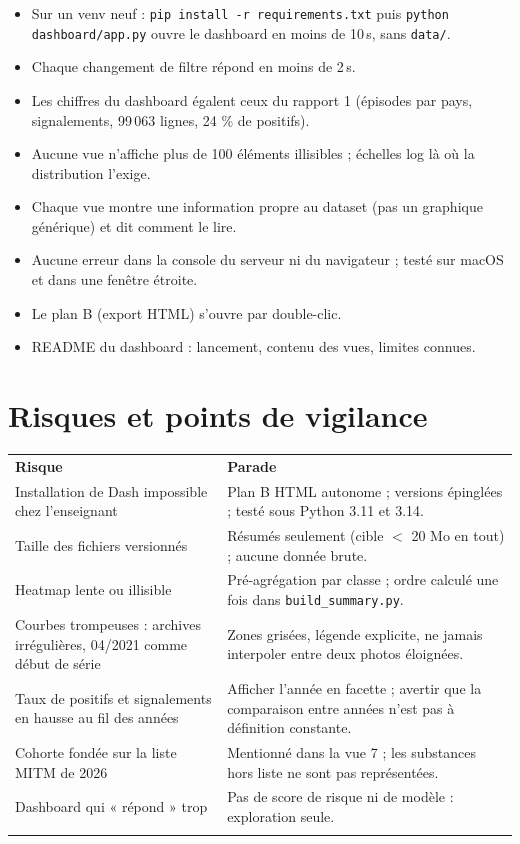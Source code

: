 \documentclass[10.5pt, a4paper]{article}
\newcommand{\entete}[1]{\textbf{\color{gris!20!black}#1}}
\newcommand{\filet}{\arrayrulecolor{gris!40}\hline}
\begin{document}
\begin{itemize}
\item[$\square$] Sur un venv neuf : \texttt{pip install -r requirements.txt} puis \texttt{python dashboard/app.py} ouvre le dashboard en moins de 10\,s, sans \texttt{data/}.
\item[$\square$] Chaque changement de filtre répond en moins de 2\,s.
\item[$\square$] Les chiffres du dashboard égalent ceux du rapport 1 (épisodes par pays, signalements, 99\,063 lignes, 24 \% de positifs).
\item[$\square$] Aucune vue n'affiche plus de 100 éléments illisibles ; échelles log là où la distribution l'exige.
\item[$\square$] Chaque vue montre une information propre au dataset (pas un graphique générique) et dit comment le lire.
\item[$\square$] Aucune erreur dans la console du serveur ni du navigateur ; testé sur macOS et dans une fenêtre étroite.
\item[$\square$] Le plan B (export HTML) s'ouvre par double-clic.
\item[$\square$] README du dashboard : lancement, contenu des vues, limites connues.
\end{itemize}

\section{Risques et points de vigilance}

\begin{tabularx}{\linewidth}{>{\raggedright\arraybackslash}p{5.0cm} >{\raggedright\arraybackslash}X}
\rowcolor{gris!14}\entete{Risque} & \entete{Parade}\\
Installation de Dash impossible chez l'enseignant & Plan B HTML autonome ; versions épinglées ; testé sous Python 3.11 et 3.14. \\
Taille des fichiers versionnés & Résumés seulement (cible $<$ 20 Mo en tout) ; aucune donnée brute. \\
Heatmap lente ou illisible & Pré-agrégation par classe ; ordre calculé une fois dans \texttt{build\_summary.py}. \\
Courbes trompeuses : archives irrégulières, 04/2021 comme début de série & Zones grisées, légende explicite, ne jamais interpoler entre deux photos éloignées. \\
Taux de positifs et signalements en hausse au fil des années & Afficher l'année en facette ; avertir que la comparaison entre années n'est pas à définition constante. \\
Cohorte fondée sur la liste MITM de 2026 & Mentionné dans la vue 7 ; les substances hors liste ne sont pas représentées. \\
Dashboard qui « répond » trop & Pas de score de risque ni de modèle : exploration seule. \\
\filet
\end{tabularx}
\end{document}

